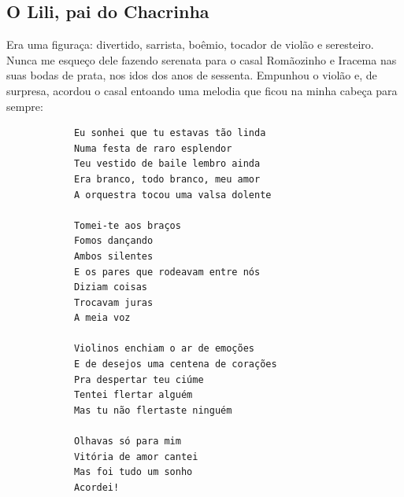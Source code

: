\documentclass[12pt,brazil,]{book}
\begin{document}
\subsection{O Lili, pai do Chacrinha}\label{o-lili-pai-do-chacrinha}

Era uma figuraça: divertido, sarrista, boêmio, tocador de violão e
seresteiro. Nunca me esqueço dele fazendo serenata para o casal
Romãozinho e Iracema nas suas bodas de prata, nos idos dos anos de
sessenta. Empunhou o violão e, de surpresa, acordou o casal entoando uma
melodia que ficou na minha cabeça para sempre:

\begin{verbatim}
            Eu sonhei que tu estavas tão linda
            Numa festa de raro esplendor
            Teu vestido de baile lembro ainda
            Era branco, todo branco, meu amor
            A orquestra tocou uma valsa dolente

            Tomei-te aos braços
            Fomos dançando
            Ambos silentes
            E os pares que rodeavam entre nós
            Diziam coisas
            Trocavam juras
            A meia voz

            Violinos enchiam o ar de emoções
            E de desejos uma centena de corações
            Pra despertar teu ciúme
            Tentei flertar alguém
            Mas tu não flertaste ninguém

            Olhavas só para mim
            Vitória de amor cantei
            Mas foi tudo um sonho
            Acordei!
\end{verbatim}
\end{document}
